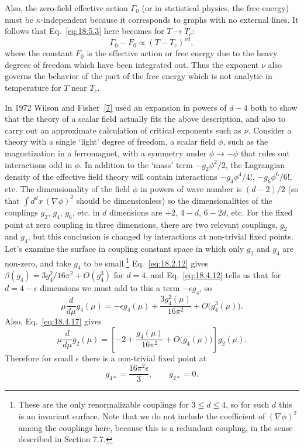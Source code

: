 Also, the zero-field effective action $\Gamma_0$ (or in statistical physics, the free energy) must be $\kappa$-independent because it corresponds to graphs with no external lines. It follows that Eq.~\eqref{eq:18.5.3} here becomes for $T\to T_c$:
\begin{equation}
\Gamma_0-F_0\propto(T-T_c)^{\nu d},
\tag{18.5.6}\label{eq:18.5.6}
\end{equation}
where the constant $F_0$ is the effective action or free energy due to the heavy degrees of freedom which have been integrated out. Thus the exponent $\nu$ also governs the behavior of the part of the free energy which is not analytic in temperature for $T$ near $T_c$.

In 1972 Wilson and Fisher~\hyperref[ch18-ref-7]{[7]} used an expansion in powers of $d-4$ both to show that the theory of a scalar field actually fits the above description, and also to carry out an approximate calculation of critical exponents such as $\nu$. Consider a theory with a single `light' degree of freedom, a scalar field $\phi$, such as the magnetization in a ferromagnet, with a symmetry under $\phi\to-\phi$ that rules out interactions odd in $\phi$. In addition to the `mass' term $-g_2\phi^2/2$, the Lagrangian density of the effective field theory will contain interactions $-g_4\phi^4/4!$, $-g_6\phi^6/6!$, etc. The dimensionality of the field $\phi$ in powers of wave number is $(d-2)/2$ (so that $\int d^dx\,(\nabla\phi)^2$ should be dimensionless) so the dimensionalities of the couplings $g_2$, $g_4$, $g_6$, etc. in $d$ dimensions are $+2$, $4-d$, $6-2d$, etc. For the fixed point at zero coupling in three dimensions, there are two relevant couplings, $g_2$ and $g_4$, but this conclusion is changed by interactions at non-trivial fixed points. Let's examine the surface in coupling constant space in which only $g_2$ and $g_4$ are non-zero, and take $g_4$ to be small.\footnote{These are the only renormalizable couplings for $3\le d\le4$, so for such $d$ this is an invariant surface. Note that we do not include the coefficient of $(\nabla\phi)^2$ among the couplings here, because this is a redundant coupling, in the sense described in Section 7.7.} Eq.~\eqref{eq:18.2.12} gives $\beta(g_4)=3g_4^2/16\pi^2+O(g_4^3)$ for $d=4$, and Eq.~\eqref{eq:18.4.12} tells us that for $d=4-\epsilon$ dimensions we must add to this a term $-\epsilon g_4$, so
\begin{equation}
\mu\frac{d}{d\mu}g_4(\mu)=-\epsilon g_4(\mu)
+\frac{3g_4^2(\mu)}{16\pi^2}+O\bigl(g_4^3(\mu)\bigr).
\tag{18.5.7}\label{eq:18.5.7}
\end{equation}
Also, Eq.~\eqref{eq:18.4.17} gives
\begin{equation}
\mu\frac{d}{d\mu}g_2(\mu)
=\left[-2+\frac{g_4(\mu)}{16\pi^2}+O\bigl(g_4(\mu)\bigr)\right]g_2(\mu).
\tag{18.5.8}\label{eq:18.5.8}
\end{equation}
Therefore for small $\epsilon$ there is a non-trivial fixed point at
\begin{equation}
g_{4*}=\frac{16\pi^2\epsilon}{3},\qquad g_{2*}=0.
\tag{18.5.9}\label{eq:18.5.9}
\end{equation}

